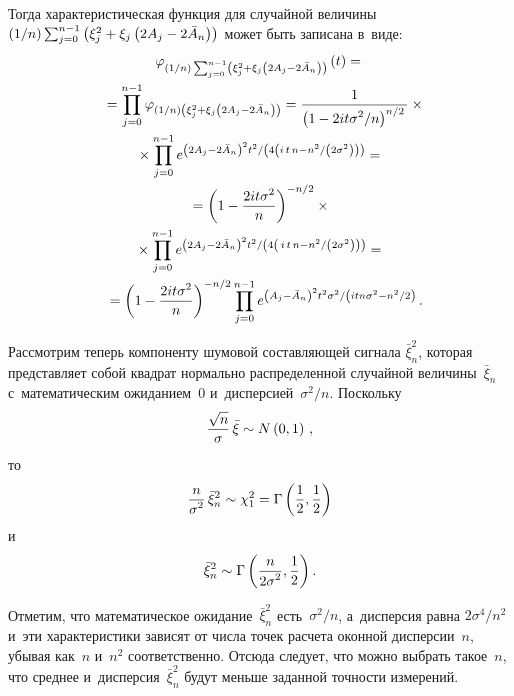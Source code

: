 \begin{multicols}{2}
   \noindent
    Тогда характеристическая функция для случайной величины  
    $({1}/{n}) \sum\nolimits_{j=0}^{n-1}\left( \xi_{j}^{2}\hm + 
    \xi_{j} \left( 2A_{j}\hm-2\bar{A}_{n}\right)\right)$ может быть записана в~виде:
\begin{multline*}
    \varphi_{({1}/{n}) \sum\nolimits_{j=0}^{n-1}\left( \xi_{j}^{2} + \xi_{j} 
    \left( 2A_{j}-2\bar{A}_{n}\right)\right) }\left( t\right)  = {}\\
    {}=
    \prod\limits_{j=0}^{n-1}\varphi_{({1}/{n})\left( 
    \xi_{j}^{2} + \xi_{j} \left( 2A_{j}-2\bar{A}_{n}\right)\right) } = 
    \displaystyle\frac{\displaystyle 1\mathstrut}{\displaystyle \left( 1-{2it\sigma^2}/{n}\right)^{{n}/{2}} \mathstrut} \times{}\hspace*{-6pt}\\
    {}\times
\prod\limits_{j=0}^{n-1} 
e^{{\left( 2A_{j}-2\bar{A}_{n}\right)^{2}t^{2}}/
\left({4\left(i\,t\,n - {n^2}/\left({2\sigma^{2}}\right)\right) }\right)} = {}\\
{}= 
\left( 1-\displaystyle\frac{\displaystyle 2it\sigma^2\mathstrut}{\displaystyle n\mathstrut}\right)^{-{n}/{2}} \times{}\\
{}\times \prod\limits_{j=0}^{n-1} 
e^{{\left( 2A_{j}-2\bar{A}_{n}\right)^{2}t^{2}}/
\left({4\left(\,i\,t\,n - {n^2}/\left({2\sigma^{2}}\right)\right) }\right)} = {}\\
{}=
\left( 1-\displaystyle\frac{\displaystyle 2it\sigma^2\mathstrut}{\displaystyle n\mathstrut}\right)^{-{n}/{2}}  
\prod\limits_{j=0}^{n-1} e^{{\left( A_{j}-\bar{A}_{n}\right)^{2}t^{2} \sigma^{2} }/
\left({itn\sigma^2 - {n^2}/{2} }\right) }\,.\hspace*{-6pt}
\end{multline*}
    
    Рассмотрим теперь компоненту шумовой со\-став\-ля\-ющей сигнала $\bar{\xi}_{n}^{2}$, 
    которая представляет собой квадрат нормально распределенной случайной 
    величины~$\bar{\xi}_{n}$ с~математическим ожиданием~0 
    и~дис\-пер\-си\-ей~${\sigma^{2}}/{n}$. Поскольку
$$
    \displaystyle\frac{\displaystyle \sqrt{n}\mathstrut}{\displaystyle \sigma\mathstrut}\,\bar{\xi} \sim N \left( 0, 1\right)\,,
$$
то
$$
    \displaystyle\frac{\displaystyle n\mathstrut}{\displaystyle \sigma^{2}\mathstrut}\,\bar{\xi}_{n}^{2}  \sim \chi^{2}_{1} = 
    \Gamma\left( \displaystyle\frac{\displaystyle 1\mathstrut}{\displaystyle 2\mathstrut}, \displaystyle\frac{\displaystyle 1\mathstrut}{\displaystyle 2\mathstrut}\right)
    $$
    и
    $$ 
    \bar{\xi}_{n}^{2}  \sim  \Gamma\left( \displaystyle\frac{\displaystyle n\mathstrut}{\displaystyle 2\sigma^{2}\mathstrut}, \displaystyle\frac{\displaystyle 1\mathstrut}{\displaystyle 2\mathstrut}\right).
$$
    
    Отметим, что математическое ожидание~$\bar{\xi}_{n}^{2}$ есть~${\sigma^{2}}/{n}$, 
    а~дисперсия равна ${2\sigma^{4}}/{n^{2}}$ и~эти характеристики зависят от числа 
    точек расчета оконной дисперсии~$n$, убывая  как~$n$ и~$n^{2}$ соответственно. 
    Отсюда следует, что можно выбрать такое~$n$, что среднее 
    и~дисперсия~$\bar{\xi}_{n}^{2}$ будут меньше заданной точности измерений.
    

\end{multicols}
